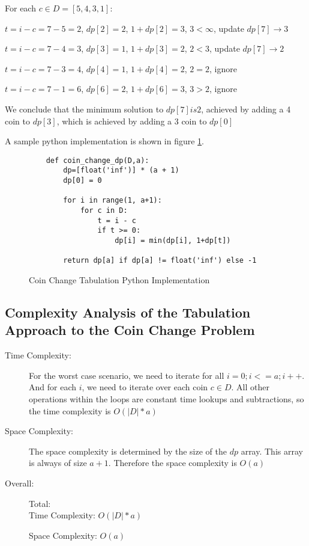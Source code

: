 For each $c \in D = [5,4,3,1]$:

$t = i-c = 7-5 = 2$, $dp[2] = 2$, $1 + dp[2] = 3$, $3 < \infty$, update $dp[7] \rightarrow 3$

$t = i-c = 7-4 = 3$, $dp[3] = 1$, $1+dp[3] = 2$, $2 < 3$, update $dp[7] \rightarrow 2$

$t = i-c = 7-3 = 4$, $dp[4] = 1$, $1+dp[4] = 2$, $2 = 2$, ignore

$t = i-c = 7-1 = 6$, $dp[6] = 2$, $1+dp[6] = 3$, $3 > 2$, ignore

We conclude that the minimum solution to $dp[7] is 2$, achieved by adding a 4 coin to $dp[3]$, which is achieved by adding a 3 coin to $dp[0]$

A sample python implementation is shown in figure \ref{fig:coin-change-dp}.

\begin{figure}[H]
    \centering
    \begin{lstlisting}
    def coin_change_dp(D,a):
        dp=[float('inf')] * (a + 1)
        dp[0] = 0
    
        for i in range(1, a+1):
            for c in D:
                t = i - c
                if t >= 0:
                    dp[i] = min(dp[i], 1+dp[t])
    
        return dp[a] if dp[a] != float('inf') else -1
    \end{lstlisting}
    \caption{Coin Change Tabulation Python Implementation}
    \label{fig:coin-change-dp}
\end{figure}

\subsection{Complexity Analysis of the Tabulation Approach to the Coin Change Problem}

\begin{description}
    \item[Time Complexity:]
        For the worst case scenario, we need to iterate for all $i = 0; i <= a; i++$.
        And for each $i$, we need to iterate over each coin $c \in D$.
        All other operations within the loops are constant time lookups and subtractions, so the time complexity is $O(|D| * a)$
            
    \item[Space Complexity:] 
        The space complexity is determined by the size of the $dp$ array. This array is always of size $a+1$.
        Therefore the space complexity is $O(a)$
        
    \item[Overall:] Total:\\
        Time Complexity: $O(|D| * a)$

        Space Complexity: $O(a)$
        
\end{description}